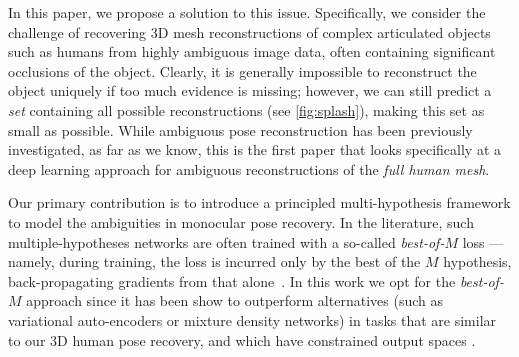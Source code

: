 In this paper, we propose a solution to this issue.
Specifically, we consider the challenge of recovering 3D mesh reconstructions of complex articulated objects such as humans from highly ambiguous image data, often containing significant occlusions of the object.
Clearly, it is generally impossible to reconstruct the object uniquely if too much evidence is missing; however, we can still predict a \emph{set} containing all possible reconstructions (see \cref{fig:splash}), making this set as small as possible.
While ambiguous pose reconstruction has been previously investigated, as far as we know, this is the first paper that looks specifically at a deep learning approach for ambiguous reconstructions of the \emph{full human mesh}.

\begin{figure}
\setlength{\fboxsep}{0pt}%
\setlength{\fboxrule}{0pt}%
\vspace{-0.2cm}
\end{figure}

Our primary contribution is to introduce a principled multi-hypothesis framework to model the ambiguities in monocular pose recovery.
In the literature, such multiple-hypotheses networks are often trained with a so-called \emph{best-of-$M$} loss --- namely, during training, the loss is incurred only by the best of the $M$ hypothesis, back-propagating gradients from that alone~\cite{guzman2012multiple}.
In this work we opt for the \emph{best-of-$M$} approach since it has been show to outperform  alternatives (such as variational auto-encoders or mixture density networks) in tasks that are similar to our 3D human pose recovery, and which have constrained output spaces \cite{rupprecht17learning}.


